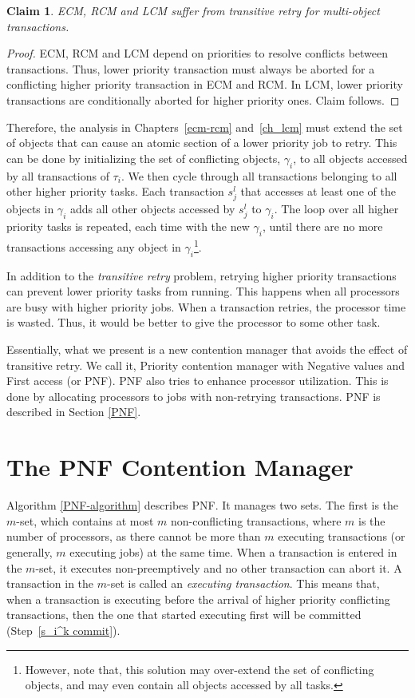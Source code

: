 \documentclass[12pt,english]{report}
\newtheorem{clm}{Claim}
\newtheorem{proof}{Proof}
\begin{document}
\begin{clm}\label{ecm-rcm-transitive-retry}
ECM, RCM and LCM suffer from transitive retry for multi-object transactions.
\end{clm}
\begin{proof}\normalfont
ECM, RCM and LCM depend on priorities to resolve conflicts between transactions. Thus, lower priority transaction must always be aborted for a conflicting higher priority transaction in ECM and RCM. In LCM, lower priority transactions are conditionally aborted for higher priority ones. Claim follows. 
\end{proof}

Therefore, the analysis in Chapters~\ref{ecm-rcm} and~\ref{ch_lcm} must extend the set of objects that can cause an atomic section of a lower priority job to retry.  This can be done by initializing the set of conflicting objects, $\gamma_i$, to all objects accessed by all transactions of $\tau_i$. We then cycle through all transactions belonging to all other higher priority tasks. Each transaction $s_j^l$ that accesses at least one of the objects in $\gamma_i$ adds all other objects accessed by $s_j^l$ to $\gamma_i$. The loop over all higher priority tasks is repeated, each time with the new $\gamma_i$, until there are no more transactions accessing any object in $\gamma_i$\footnote{However, note that, this solution may over-extend the set of conflicting objects, and may even contain all objects accessed by all tasks.}.

In addition to the \emph{transitive retry} problem, retrying higher priority transactions can prevent lower priority tasks from running. This happens when all processors are busy with higher priority jobs. When a transaction retries, the processor time is wasted. Thus, it would be better to give the processor to some other task.


Essentially, what we present is a new contention manager that avoids the effect of transitive retry. We call it, Priority contention manager with Negative values and First access (or PNF). PNF also tries to enhance processor utilization. This is done by allocating processors to jobs with non-retrying transactions. PNF is described in Section \ref{PNF}.

\section{The PNF Contention Manager\label{PNF}}

Algorithm \ref{PNF-algorithm} describes PNF. It
manages two sets. The first is the $m$-set, which contains at most $m$ non-conflicting
transactions, where $m$ is the number of processors, as
there cannot be more than $m$ executing transactions (or generally,
$m$ executing jobs) at the same time. When a transaction is entered
in the $m$-set, it executes non-preemptively and no other transaction
can abort it. A transaction in the $m$-set is called an \emph{executing
transaction}. 
This means that, when a transaction is executing before
the arrival of higher priority conflicting transactions, then the
one that started executing first will be committed (Step~\ref{s_i^k commit}). 
\end{document}

